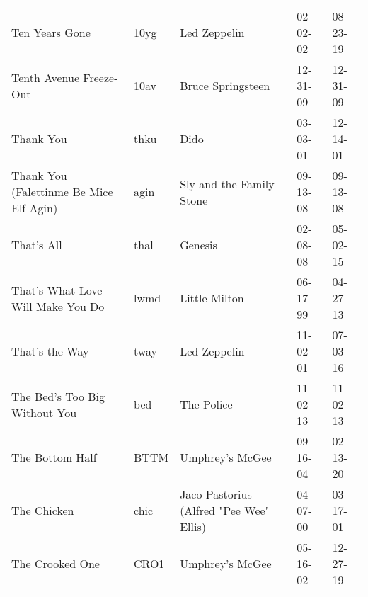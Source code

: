 \begin{longtable}{p{}p{}p{}p{}p{}}
                                                          Ten Years Gone &          10yg &                                             Led Zeppelin &              02-02-02 &             08-23-19 \\
                                                 Tenth Avenue Freeze-Out &          10av &                                        Bruce Springsteen &              12-31-09 &             12-31-09 \\
                                                               Thank You &          thku &                                                     Dido &              03-03-01 &             12-14-01 \\
                                 Thank You (Falettinme Be Mice Elf Agin) &          agin &                                 Sly and the Family Stone &              09-13-08 &             09-13-08 \\
                                                              That's All &          thal &                                                  Genesis &              02-08-08 &             05-02-15 \\
                                       That's What Love Will Make You Do &          lwmd &                                            Little Milton &              06-17-99 &             04-27-13 \\
                                                          That's the Way &          tway &                                             Led Zeppelin &              11-02-01 &             07-03-16 \\
                                           The Bed's Too Big Without You &           bed &                                               The Police &              11-02-13 &             11-02-13 \\
                                                         The Bottom Half &          BTTM &                                          Umphrey's McGee &              09-16-04 &             02-13-20 \\
                                                             The Chicken &          chic &                  Jaco Pastorius (Alfred "Pee Wee" Ellis) &              04-07-00 &             03-17-01 \\
                                                         The Crooked One &          CRO1 &                                          Umphrey's McGee &              05-16-02 &             12-27-19 \\

\end{longtable}
